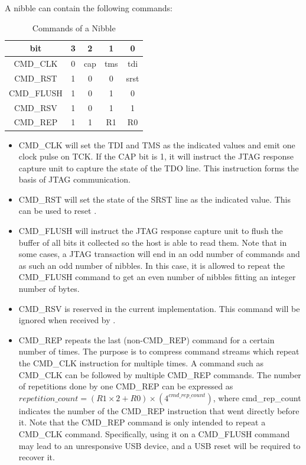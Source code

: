 \documentclass[main\_\_EN.tex]{subfiles}
\begin{document}
A nibble can contain the following commands:

\begin{table}[H]
    \centering
    \caption{Commands of a Nibble}
    \label{tab:usbserialjtag-commands-of-a-nibble}
    
    \begin{tabular}{|c|c c c c|}
    \hline
        \rowcolor{lightgray}
        \textbf{bit} & \textbf{3} & \textbf{2} & \textbf{1} & \textbf{0}
        \\\hline
        
        CMD\_CLK & 0 &  cap & tms & tdi \\\hline
        CMD\_RST & 1 & 0 & 0 & srst \\\hline
        CMD\_FLUSH & 1 & 0 & 1 & 0 \\\hline
        CMD\_RSV & 1 & 0 & 1 & 1 \\\hline
        CMD\_REP & 1 & 1 & R1 & R0 \\\hline
    \end{tabular}
\end{table}

\begin{itemize}
\item CMD\_CLK will set the TDI and TMS as the indicated values and emit one clock pulse on TCK. If the CAP bit is 1, it will instruct the JTAG response capture unit to capture the state of the TDO line. This instruction forms the basis of JTAG communication.

\item CMD\_RST will set the state of the SRST line as the indicated value. This can be used to reset \chipname{}.

\item CMD\_FLUSH will instruct the JTAG response capture unit to flush the buffer of all bits it collected so the host is able to read them. Note that in some cases, a JTAG transaction will end in an odd number of commands and as such an odd number of nibbles. In this case, it is allowed to repeat the CMD\_FLUSH command to get an even number of nibbles fitting an integer number of bytes.

\item CMD\_RSV is reserved in the current implementation. This command will be ignored when received by \chipname{}.

\item CMD\_REP repeats the last (non-CMD\_REP) command for a certain number of times. The purpose is to compress command streams which repeat the CMD\_CLK instruction for multiple times. A command such as CMD\_CLK can be followed by multiple CMD\_REP commands. The number of repetitions done by one CMD\_REP can be expressed as \begin{math}repetition\_count = (R1 \times 2 + R0) \times (4^{cmd\_rep\_count})\end{math}, where cmd\_rep\_count indicates the number of the CMD\_REP instruction that went directly before it. Note that the CMD\_REP command is only intended to repeat a CMD\_CLK command. Specifically, using it on a CMD\_FLUSH command may lead to an unresponsive USB device, and a USB reset will be required to recover it.
\end{itemize}
\end{document}

